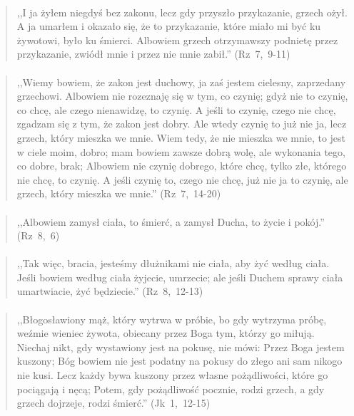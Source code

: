 \documentclass[10pt,a4paper,oneside]{article}
\begin{document}
\paragraph{}
\begin{quote}
,,I ja żyłem niegdyś bez zakonu, lecz gdy przyszło przykazanie, grzech ożył. A ja umarłem i okazało się, że to przykazanie, które miało mi być ku żywotowi, było ku śmierci. Albowiem grzech otrzymawszy podnietę przez przykazanie, zwiódł mnie i przez nie mnie zabił.'' \mbox{(Rz 7, 9-11)}
\end{quote}
\paragraph{}
\begin{quote}
,,Wiemy bowiem, że zakon jest duchowy, ja zaś jestem cielesny, zaprzedany grzechowi. Albowiem nie rozeznaję się w tym, co czynię; gdyż nie to czynię, co chcę, ale czego nienawidzę, to czynię. A jeśli to czynię, czego nie chcę, zgadzam się z tym, że zakon jest dobry. Ale wtedy czynię to już nie ja, lecz grzech, który mieszka we mnie. Wiem tedy, że nie mieszka we mnie, to jest w ciele moim, dobro; mam bowiem zawsze dobrą wolę, ale wykonania tego, co dobre, brak; Albowiem nie czynię dobrego, które chcę, tylko złe, którego nie chcę, to czynię. A jeśli czynię to, czego nie chcę, już nie ja to czynię, ale grzech, który mieszka we mnie.'' \mbox{(Rz 7, 14-20)}
\end{quote}
\paragraph{}
\begin{quote}
,,Albowiem zamysł ciała, to śmierć, a zamysł Ducha, to życie i pokój.'' \mbox{(Rz 8, 6)}
\end{quote}
\paragraph{}
\begin{quote}
,,Tak więc, bracia, jesteśmy dłużnikami nie ciała, aby żyć według ciała. Jeśli bowiem według ciała żyjecie, umrzecie; ale jeśli Duchem sprawy ciała umartwiacie, żyć będziecie.'' \mbox{(Rz 8, 12-13)}
\end{quote}
\paragraph{}
\begin{quote}
,,Błogosławiony mąż, który wytrwa w próbie, bo gdy wytrzyma próbę, weźmie wieniec żywota, obiecany przez Boga tym, którzy go miłują. Niechaj nikt, gdy wystawiony jest na pokusę, nie mówi: Przez Boga jestem kuszony; Bóg bowiem nie jest podatny na pokusy do złego ani sam nikogo nie kusi. Lecz każdy bywa kuszony przez własne pożądliwości, które go pociągają i nęcą; Potem, gdy pożądliwość pocznie, rodzi grzech, a gdy grzech dojrzeje, rodzi śmierć.'' \mbox{(Jk 1, 12-15)}
\end{quote}
\end{document}
